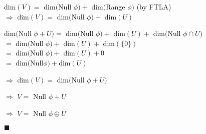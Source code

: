 \documentclass{article}
\begin{document}
dim$(V) =$ dim$($Null $ \phi) +$ dim$($Range $ \phi)$ (by FTLA)\\
$\Rightarrow$ dim$(V) =$ dim$($Null $ \phi) +$ dim$(U)$

dim$($Null $\phi + U) =$ dim$($Null $\phi) +$ dim$(U) +$ dim$($Null $\phi \cap U)$\\
$=$ dim$($Null $\phi) +$ dim$(U) +$ dim$(\{0\})$ \\
$=$ dim$($Null $\phi) +$ dim$(U) + 0$\\
$=$ dim$($Null$\phi) +$dim$(U)$

$\Rightarrow$ dim$(V) =$ dim$($Null $\phi + U)$

$\Rightarrow$ $V =$ Null $\phi + U$

$\Rightarrow$ $V =$ Null $\phi \oplus U$

\vspace{0.618 em}
$\blacksquare$
\end{document}
